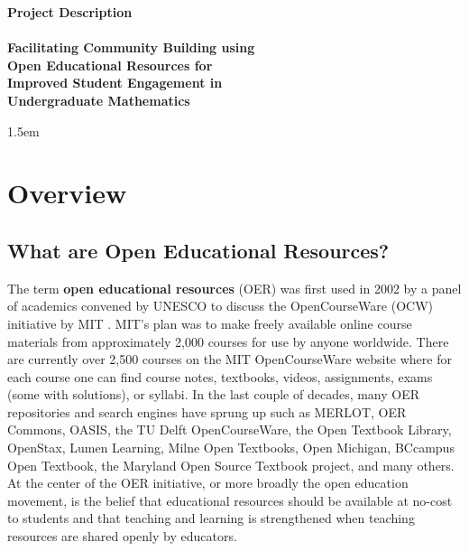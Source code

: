 \documentclass[11pt]{article}
\begin{document}
\thispagestyle{empty}
\begin{center}
\textbf{\Large Project Description}\\[0.25cm]
\hrulefill\\[0.2cm]
\textbf{\Large Facilitating Community Building using\\[0.2ex] Open Educational Resources for\\[0.2ex] Improved Student Engagement in\\[0.2ex] Undergraduate Mathematics}\\
\hrulefill
\end{center}
\baselineskip 1.5em

\tableofcontents

\section{Overview}

\subsection{What are Open Educational Resources?}
The term \textbf{open educational resources} (OER) was first used in 2002 by a panel of academics convened by UNESCO to discuss the OpenCourseWare (OCW) initiative by MIT \cite{unescoforum:02, oerguidelines}.  MIT's plan was to make freely available online course materials from approximately 2,000 courses for use by anyone worldwide.  There are currently over 2,500 courses on the MIT OpenCourseWare website where for each course one can find course notes, textbooks, videos, assignments, exams (some with solutions), or syllabi.  In the last couple of decades, many OER repositories and search engines have sprung up such as MERLOT, OER Commons, OASIS, the TU Delft OpenCourseWare, the Open Textbook Library, OpenStax, Lumen Learning, Milne Open Textbooks, Open Michigan, BCcampus Open Textbook, the Maryland Open Source Textbook project, and many others.  At the center of the OER initiative, or more broadly the open education movement, is the belief that educational resources should be available at no-cost to students and that teaching and learning is strengthened when teaching resources are shared openly by educators.
\end{document}
